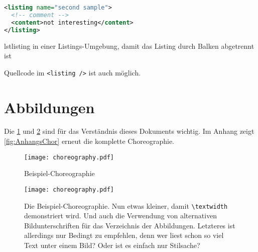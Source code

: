 \begin{Listing}
  \begin{lstlisting}[language=XML]
<listing name="second sample">
  <!-- comment -->
  <content>not interesting</content>
</listing>
\end{lstlisting}
  \caption{lstlisting in einer Listings-Umgebung, damit das Listing durch Balken abgetrennt ist}
  \label{lst:ListingANDlstlisting}
\end{Listing}



Quellcode im \lstinline|<listing />| ist auch möglich.

\section{Abbildungen}

Die \cref{fig:chor1} und \ref{fig:chor2} sind für das Verständnis dieses Dokuments wichtig.
Im Anhang zeigt \vref{fig:AnhangsChor} erneut die komplette Choreographie.

\begin{figure}
  \centering
  \texttt{[image: choreography.pdf]}
  \caption{Beispiel-Choreographie}
  \label{fig:chor1}
\end{figure}

\begin{figure}
  \centering
  \texttt{[image: choreography.pdf]}
  \caption[Beispiel-Choreographie]{Die Beispiel-Choreographie.
    Nun etwas kleiner, damit \texttt{\textbackslash textwidth} demonstriert wird.
    Und auch die Verwendung von alternativen Bildunterschriften für das Verzeichnis der Abbildungen.
    Letzteres ist allerdings nur Bedingt zu empfehlen, denn wer liest schon so viel Text unter einem Bild?
    Oder ist es einfach nur Stilsache?
  }
  \label{fig:chor2}
\end{figure}


